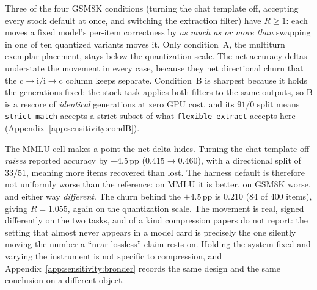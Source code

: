 Three of the four GSM8K conditions (turning the chat template off, accepting
every stock default at once, and switching the extraction filter) have
$R \geq 1$: each moves a fixed model's per-item correctness by \emph{as much as
or more than} swapping in one of ten quantized variants moves it. Only
condition~A, the multiturn exemplar placement, stays below the quantization
scale. The net accuracy deltas understate the movement in every case, because
they net directional churn that the
$\text{c}{\to}\text{i}/\text{i}{\to}\text{c}$ column keeps separate.
Condition~B is sharpest because it holds the generations fixed: the stock task
applies both filters to the same outputs, so B is a rescore of \emph{identical}
generations at zero GPU cost, and its $91/0$ split means \texttt{strict-match}
accepts a strict subset of what \texttt{flexible-extract} accepts here
(Appendix~\ref{app:sensitivity:condB}).

The MMLU cell makes a point the net delta hides. Turning the chat template off
\emph{raises} reported accuracy by $+4.5$\,pp ($0.415 \to 0.460$), with a
directional split of $33/51$, meaning more items recovered than lost. The
harness default is therefore not uniformly worse than the reference: on MMLU it
is better, on GSM8K worse, and either way \emph{different}. The churn behind the
$+4.5$\,pp is $0.210$ ($84$ of $400$ items), giving $R=1.055$, again on the
quantization scale. The movement is real, signed differently on the two tasks,
and of a kind compression papers do not report: the setting that almost never
appears in a model card is precisely the one silently moving the number a
``near-lossless'' claim rests on. Holding the system fixed and varying the
instrument is not specific to compression, and
Appendix~\ref{app:sensitivity:bronder} records the same design and the same
conclusion on a different object.
